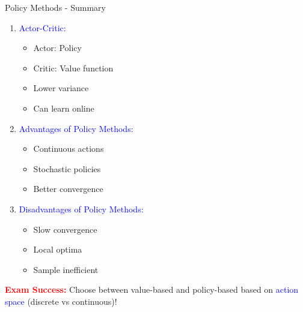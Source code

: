 \documentclass[8pt]{beamer}
\begin{document}
\begin{frame}{Policy Methods - Summary}
\begin{enumerate}
			\item \textcolor{blue}{Actor-Critic:}
			\begin{itemize}
				\item Actor: Policy
				\item Critic: Value function
				\item Lower variance
				\item Can learn online
			\end{itemize}
			
			\item \textcolor{blue}{Advantages of Policy Methods:}
			\begin{itemize}
				\item Continuous actions
				\item Stochastic policies
				\item Better convergence
			\end{itemize}
			
			\item \textcolor{blue}{Disadvantages of Policy Methods:}
			\begin{itemize}
				\item Slow convergence
				\item Local optima
				\item Sample inefficient
			\end{itemize}
		\end{enumerate}
		
		\textcolor{red}{\textbf{Exam Success:}} Choose between value-based and policy-based based on \textcolor{blue}{action space} (discrete vs continuous)!
	\end{frame}
	
	
\end{document}
